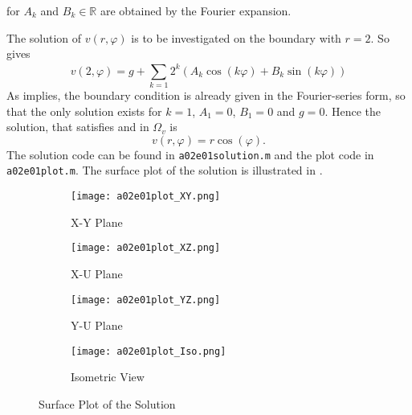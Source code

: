 for $A_k$ and $B_k \in \mathbb{R}$ are obtained by the Fourier expansion.
\par
The solution of $v(r, \varphi)$ is to be investigated on the boundary with $r = 2$.
So gives
\begin{equation}
	\label{eq:vBoundary}
	v(2, \varphi) = g + \sum_{k=1}^{} 2^k \left( A_k \cos{(k \varphi)} + B_k \sin(k \varphi)\right)
\end{equation}
As  implies, the boundary condition is already given in the Fourier-series form, so that the only solution exists for $k = 1$, $A_1 = 0$, $B_1 = 0$ and $g=0$.
Hence the solution, that satisfies  and  in $\Omega_v$ is
\begin{equation}
	\label{eq:vSol}
	v(r, \varphi) = r \cos{(\varphi)}
	\text{.}
\end{equation}
%
The solution code can be found in \texttt{a02e01solution.m} and the plot code in \texttt{a02e01plot.m}.
The surface plot of the  solution is illustrated in .
\begin{figure}[H]
\vspace*{\FigUpperVSpace}
\def\MeshFigWidth{220pt}
	\begin{subfigure}{0.5\hsize}
		\centering
		\texttt{[image: a02e01plot\_XY.png]} 
		\caption{X-Y Plane}
		\label{fig:a02e01plot_XY}
	\end{subfigure}
	\begin{subfigure}{0.5\hsize}
		\centering
		\texttt{[image: a02e01plot\_XZ.png]} 
		\caption{X-U Plane}
		\label{fig:a02e01plot_XZ}
	\end{subfigure}
	\vfill
	\begin{subfigure}{0.5\hsize}
		\centering
		\texttt{[image: a02e01plot\_YZ.png]} 
		\caption{Y-U Plane}
		\label{fig:a02e01plot_YZ}
	\end{subfigure}
	\begin{subfigure}{0.5\hsize}
		\centering
		\texttt{[image: a02e01plot\_Iso.png]} 
		\caption{Isometric View}
		\label{fig:a02e01plot_Iso}
	\end{subfigure}
	\caption{Surface Plot of the Solution}
	\label{fig:a02e01plot}
\end{figure}

%

